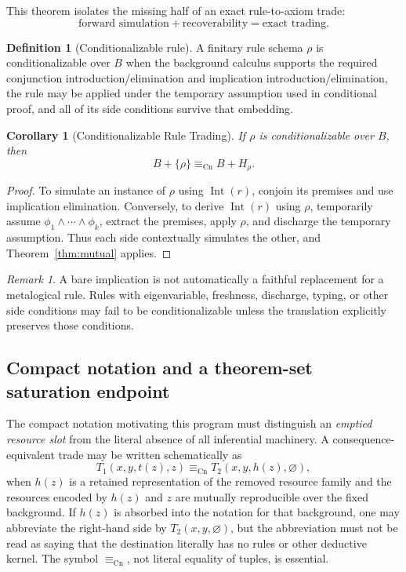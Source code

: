 \documentclass[11pt]{article}
\newtheorem{corollary}[theorem]{Corollary}
\theoremstyle{definition}
\newtheorem{definition}[theorem]{Definition}
\theoremstyle{remark}
\newtheorem{remark}[theorem]{Remark}
\newcommand{\Int}{\operatorname{Int}}
\newcommand{\equivCn}{\equiv_{\mathrm{Cn}}}
\begin{document}
This theorem isolates the missing half of an exact rule-to-axiom trade:
\[
\boxed{\text{forward simulation}+\text{recoverability}=\text{exact trading}.}
\]

\begin{definition}[Conditionalizable rule]
A finitary rule schema $\rho$ is conditionalizable over $B$ when the background calculus supports the required conjunction introduction/elimination and implication introduction/elimination, the rule may be applied under the temporary assumption used in conditional proof, and all of its side conditions survive that embedding.
\end{definition}

\begin{corollary}[Conditionalizable Rule Trading]\label{cor:conditional}
If $\rho$ is conditionalizable over $B$, then
\[
B+\{\rho\}\equivCn B+H_\rho.
\]
\end{corollary}

\begin{proof}
To simulate an instance of $\rho$ using $\Int(r)$, conjoin its premises and use implication elimination. Conversely, to derive $\Int(r)$ using $\rho$, temporarily assume $\phi_1\land\cdots\land\phi_k$, extract the premises, apply $\rho$, and discharge the temporary assumption. Thus each side contextually simulates the other, and Theorem~\ref{thm:mutual} applies.
\end{proof}

\begin{remark}
A bare implication is not automatically a faithful replacement for a metalogical rule. Rules with eigenvariable, freshness, discharge, typing, or other side conditions may fail to be conditionalizable unless the translation explicitly preserves those conditions.
\end{remark}

\subsection{Compact notation and a theorem-set saturation endpoint}
The compact notation motivating this program must distinguish an \emph{emptied resource slot} from the literal absence of all inferential machinery. A consequence-equivalent trade may be written schematically as
\[
T_1(x,y,t(z),z)\equivCn T_2(x,y,h(z),\varnothing),
\]
when $h(z)$ is a retained representation of the removed resource family and the resources encoded by $h(z)$ and $z$ are mutually reproducible over the fixed background. If $h(z)$ is absorbed into the notation for that background, one may abbreviate the right-hand side by $T_2(x,y,\varnothing)$, but the abbreviation must not be read as saying that the destination literally has no rules or other deductive kernel. The symbol $\equivCn$, not literal equality of tuples, is essential.
\end{document}
